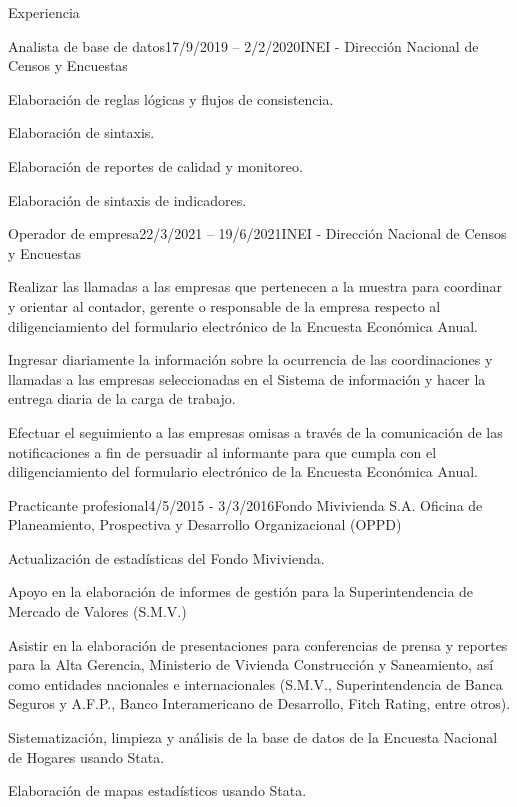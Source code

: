 \documentclass[
	11pt, %
]{resume} %
\begin{document}
\begin{rSection}{Experiencia}

	\begin{rSubsection}{Analista de base de datos}{17/9/2019 – 2/2/2020}{INEI - Dirección Nacional de Censos y Encuestas}{}
		\item Elaboración de reglas lógicas y flujos de consistencia.
		\item Elaboración de sintaxis.
		\item Elaboración de reportes de calidad y monitoreo.
		\item Elaboración de sintaxis de indicadores.
	\end{rSubsection}


	\begin{rSubsection}{Operador de empresa}{22/3/2021 – 19/6/2021}{INEI - Dirección Nacional de Censos y Encuestas}{}
\item Realizar las llamadas a las empresas que pertenecen a la muestra para coordinar y orientar al contador, gerente o responsable de la empresa respecto al diligenciamiento del formulario electrónico de la Encuesta Económica Anual.
\item Ingresar diariamente la información sobre la ocurrencia de las coordinaciones y llamadas a las empresas seleccionadas en el Sistema de información y hacer la entrega diaria de la carga de trabajo.
\item Efectuar el seguimiento a las empresas omisas a través de la comunicación de las notificaciones a fin de persuadir al informante para que cumpla con el diligenciamiento del formulario electrónico de la Encuesta Económica Anual.
	\end{rSubsection}


	\begin{rSubsection}{Practicante profesional}{4/5/2015 - 3/3/2016}{Fondo Mivivienda S.A. Oficina de Planeamiento, Prospectiva y Desarrollo Organizacional (OPPD)}{}
\item	Actualización de estadísticas del Fondo Mivivienda.
\item	Apoyo en la elaboración de informes de gestión para la Superintendencia de Mercado de Valores (S.M.V.)
\item	Asistir en la elaboración de presentaciones para conferencias de prensa y reportes para la Alta Gerencia, Ministerio de Vivienda Construcción y Saneamiento, así como entidades nacionales e internacionales (S.M.V., Superintendencia de Banca Seguros y A.F.P., Banco Interamericano de Desarrollo, Fitch Rating, entre otros).
\item	Sistematización, limpieza y análisis de la base de datos de la Encuesta Nacional de Hogares usando Stata. 
\item	Elaboración de mapas estadísticos usando Stata.
	\end{rSubsection}


\end{rSection}
\end{document}
